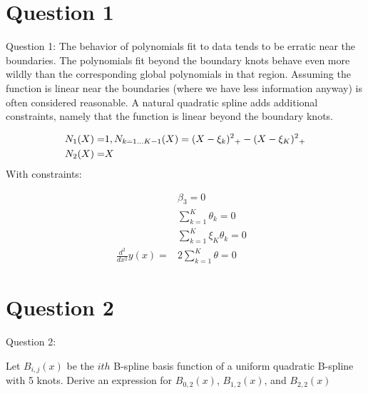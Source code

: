 \documentclass[12pt,letterpaper]{article}
\begin{document}
\section*{Question 1}

Question 1: The behavior of polynomials fit to data tends to be erratic near the boundaries. The polynomials fit beyond the boundary knots behave even more wildly than the corresponding global polynomials in that region. Assuming the function is linear near the boundaries (where we have less information anyway) is often considered reasonable. A natural quadratic spline adds additional constraints, namely that the function is linear beyond the boundary knots.

 
\begin{align*}
N_1(X)  =& 1,N_{k=1...K-1}(X) = (X-\xi_k)\textsuperscript{2}\textsubscript{+} -(X-\xi_K)\textsuperscript{2}\textsubscript{+}\\
N_2(X)  =& X 
\end{align*}
With constraints:

\begin{align*}
&\beta_3 = 0& \\
&\sum_{k=1}^K \theta_k =0& \\
&\sum_{k=1}^K \xi_K\theta_k =0& \\
\frac{d^2}{dx^2}y(x)=&2\sum_{k=1}^K\theta=0&
\end{align*}


\newpage

\section*{Question 2}

Question 2: 

Let $B_{i,j}(x)$ be the $ith$ B-spline basis function of a uniform quadratic B-spline with 5 knots.  Derive an expression for $B_{0,2}(x)$, $B_{1,2}(x)$, and $B_{2,2}(x)$
\end{document}
